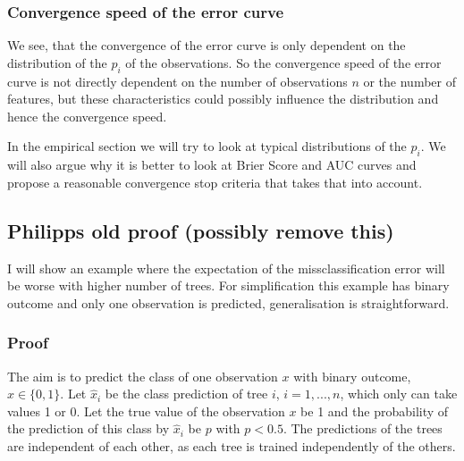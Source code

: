 \documentclass[paper=a4
               ,12pt
               ,DIV=12
               ,parskip=half
               ,titlepage=on
               ,headinclude 
               ,footinclude
               ,headsepline
               ,footsepline         %
               ,ilines 
               ]{scrartcl}
\begin{document}
\subsubsection{Convergence speed of the error curve}
We see, that the convergence of the error curve is only dependent on the distribution of the $p_i$ of the observations. So the convergence speed of the error curve is not directly dependent 
on the number of observations $n$ or the number of features, but these characteristics could possibly influence the distribution and hence the convergence speed.  

In the empirical section we will try to look at typical distributions of the $p_i$. We will also argue why it is better to look at Brier Score and AUC curves 
and propose a reasonable convergence stop criteria that takes that into account.




\subsection{Philipps old proof (possibly remove this)}

I will show an example where the expectation of the missclassification error will be worse with higher number of trees.
For simplification this example has binary outcome and only one observation is predicted, generalisation is straightforward. 

\subsubsection{Proof}
The aim is to predict the class of one observation $x$ with binary outcome, $x \in \{0,1\}$.
Let $\hat{x}_i$ be the class prediction of tree $i$, $i = 1,...,n$, which only can take values 1 or 0. 
Let the true value of the observation $x$ be 1 and the probability of the prediction of this class by $\hat{x}_i$ be $p$ with $p<0.5$. %
The predictions of the trees are independent of each other, as each tree is trained independently of the others. 
\end{document}
